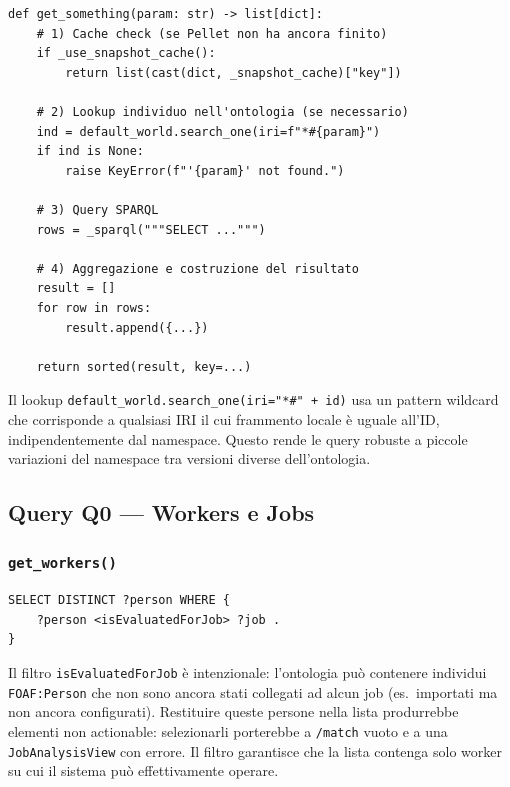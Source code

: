 \documentclass[a4paper,12pt]{article}
\begin{document}
\begin{lstlisting}[caption={Pattern comune delle funzioni di query.}]
def get_something(param: str) -> list[dict]:
    # 1) Cache check (se Pellet non ha ancora finito)
    if _use_snapshot_cache():
        return list(cast(dict, _snapshot_cache)["key"])

    # 2) Lookup individuo nell'ontologia (se necessario)
    ind = default_world.search_one(iri=f"*#{param}")
    if ind is None:
        raise KeyError(f"'{param}' not found.")

    # 3) Query SPARQL
    rows = _sparql("""SELECT ...""")

    # 4) Aggregazione e costruzione del risultato
    result = []
    for row in rows:
        result.append({...})

    return sorted(result, key=...)
\end{lstlisting}

\noindent Il lookup \texttt{default\_\allowbreak{}world.search\_\allowbreak{}one(iri="*\#" + id)} usa un
pattern wildcard che corrisponde a qualsiasi IRI il cui frammento locale
\`{e} uguale all'ID, indipendentemente dal namespace. Questo rende le
query robuste a piccole variazioni del namespace tra versioni diverse
dell'ontologia.

\subsection{Query Q0 --- Workers e Jobs}

\subsubsection{\texttt{get\_workers()}}

\begin{lstlisting}[caption={SPARQL per la lista dei workers.}]
SELECT DISTINCT ?person WHERE {
    ?person <isEvaluatedForJob> ?job .
}
\end{lstlisting}

\noindent Il filtro \texttt{isEvaluatedForJob} \`{e} intenzionale: l'ontologia pu\`{o}
contenere individui \texttt{FOAF:Person} che non sono ancora stati collegati
ad alcun job (es.\ importati ma non ancora configurati). Restituire queste
persone nella lista produrrebbe elementi non actionable: selezionarli
porterebbe a \texttt{/match} vuoto e a una \texttt{JobAnalysisView} con
errore. Il filtro garantisce che la lista contenga solo worker su cui il
sistema pu\`{o} effettivamente operare.
\end{document}

